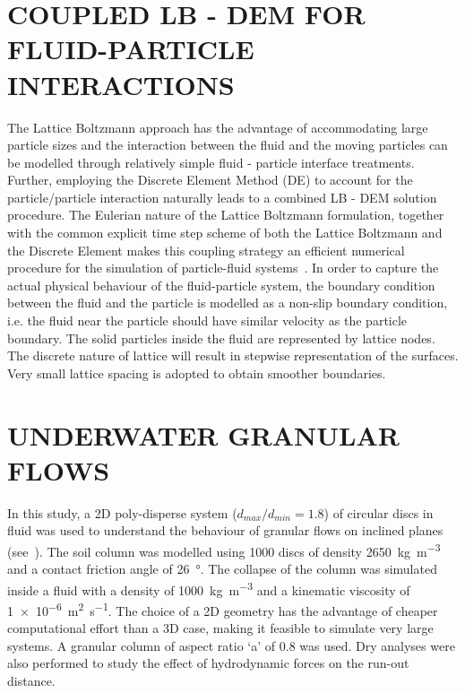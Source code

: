 \documentclass[12pt,a4paper,twocolumn,fleqn]{narms}
\begin{document}

\section{COUPLED LB - DEM FOR FLUID-PARTICLE INTERACTIONS}
The Lattice Boltzmann approach has the advantage of accommodating large particle sizes and the interaction between the fluid and the moving particles can be modelled through relatively simple fluid - particle interface treatments. Further, employing the Discrete Element Method (DE) to account for the particle/particle interaction naturally leads to a combined LB - DEM solution procedure. The Eulerian nature of the Lattice Boltzmann formulation, together with the common explicit time step scheme of both the Lattice Boltzmann and the Discrete Element makes this coupling strategy an efficient numerical procedure for the simulation of particle-fluid systems~. In order to capture the actual physical behaviour of the fluid-particle system, the boundary condition between the fluid and the particle is modelled as a non-slip boundary condition, i.e. the fluid near the particle should have similar velocity as the particle boundary. The solid particles inside the fluid are represented by lattice nodes. The discrete nature of lattice will result in stepwise representation of the surfaces. Very small lattice spacing is adopted to obtain smoother boundaries. 

\section{UNDERWATER GRANULAR FLOWS}
In this study, a 2D poly-disperse system ($d_{max}/d_{min} = 1.8$) of circular discs in fluid was used to understand the behaviour of granular flows on inclined planes (see~). The soil column was modelled using 1000 discs of density \SI{2650}{\kg\per\cubic\meter} and a contact friction angle of \SI{26}{\degree}. The collapse of the column was simulated inside a fluid with a density of \SI{1000}{\kg\per\cubic\meter}  and a kinematic viscosity of \SI{1e-6}{\square\meter\per\second}. The choice of a 2D geometry has the advantage of cheaper computational effort than a 3D case, making it feasible to simulate very large systems. A granular column of aspect ratio `a' of 0.8 was used. Dry analyses were also performed to study the effect of hydrodynamic forces on the run-out distance.
\end{document}
